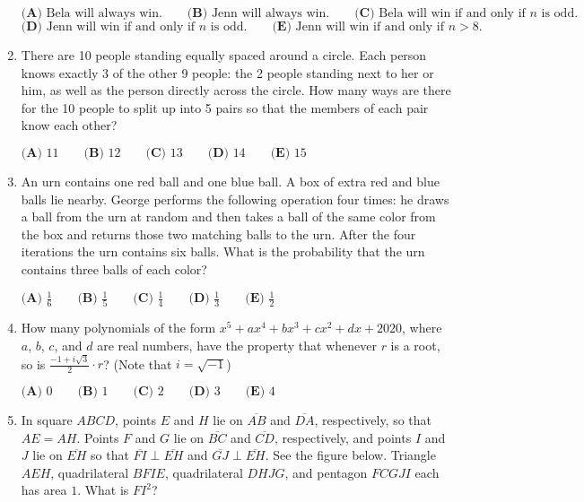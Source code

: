 \documentclass{article}
\begin{document}
\begin{enumerate}[label=\arabic*., itemsep=0.5em]
$\textbf{(A)} \text{ Bela will always win.} \qquad \textbf{(B)} \text{ Jenn will always win.} \qquad \textbf{(C)} \text{ Bela will win if and only if }n \text{ is odd.}$
$\textbf{(D)} \text{ Jenn will win if and only if }n \text{ is odd.} \qquad \textbf{(E)} \text { Jenn will win if and only if } n>8.$\par \vspace{0.5em}\item There are 10 people standing equally spaced around a circle. Each person knows exactly 3 of the other 9 people: the 2 people standing next to her or him, as well as the person directly across the circle. How many ways are there for the 10 people to split up into 5 pairs so that the members of each pair know each other?

$\textbf{(A) } 11 \qquad \textbf{(B) } 12 \qquad \textbf{(C) } 13 \qquad \textbf{(D) } 14 \qquad \textbf{(E) } 15$\par \vspace{0.5em}\item An urn contains one red ball and one blue ball. A box of extra red and blue balls lie nearby. George performs the following operation four times: he draws a ball from the urn at random and then takes a ball of the same color from the box and returns those two matching balls to the urn. After the four iterations the urn contains six balls. What is the probability that the urn contains three balls of each color?

$\textbf{(A) } \frac16 \qquad \textbf{(B) }\frac15 \qquad \textbf{(C) } \frac14 \qquad \textbf{(D) } \frac13 \qquad \textbf{(E) } \frac12$\par \vspace{0.5em}\item How many polynomials of the form $x^5 + ax^4 + bx^3 + cx^2 + dx + 2020$, where $a$, $b$, $c$, and $d$ are real numbers, have the property that whenever $r$ is a root, so is $\frac{-1+i\sqrt{3}}{2} \cdot r$? (Note that $i=\sqrt{-1}$)

$\textbf{(A) } 0 \qquad \textbf{(B) }1 \qquad \textbf{(C) } 2 \qquad \textbf{(D) } 3 \qquad \textbf{(E) } 4$\par \vspace{0.5em}\item In square $ABCD$, points $E$ and $H$ lie on $\overline{AB}$ and $\overline{DA}$, respectively, so that $AE=AH.$ Points $F$ and $G$ lie on $\overline{BC}$ and $\overline{CD}$, respectively, and points $I$ and $J$ lie on $\overline{EH}$ so that $\overline{FI} \perp \overline{EH}$ and $\overline{GJ} \perp \overline{EH}$. See the figure below. Triangle $AEH$, quadrilateral $BFIE$, quadrilateral $DHJG$, and pentagon $FCGJI$ each has area $1.$ What is $FI^2$?


\end{enumerate}
\end{document}
